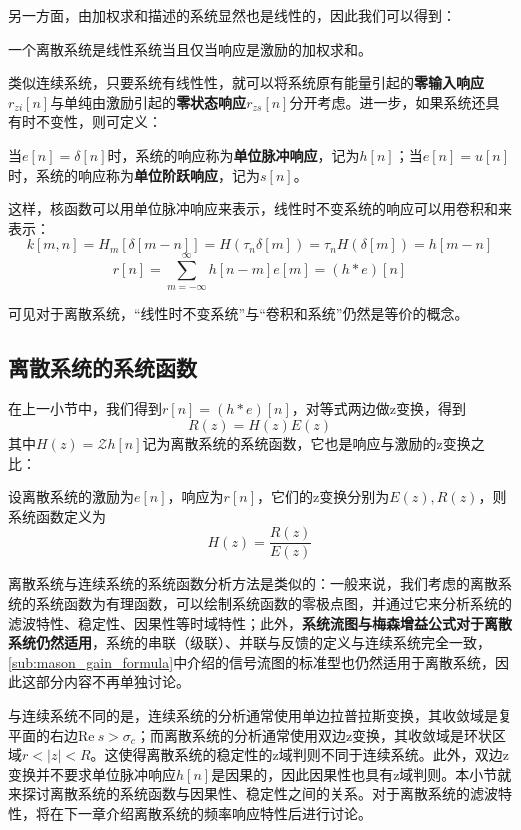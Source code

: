 \documentclass{ctexbook}
\begin{document}
另一方面，由加权求和描述的系统显然也是线性的，因此我们可以得到：
\begin{proposition}[离散线性系统的等价定义]
    一个离散系统是线性系统当且仅当响应是激励的加权求和。
\end{proposition}

类似连续系统，只要系统有线性性，就可以将系统原有能量引起的\textbf{零输入响应}$r_{zi}[n]$与单纯由激励引起的\textbf{零状态响应}$r_{zs}[n]$分开考虑。进一步，如果系统还具有时不变性，则可定义：
\begin{definition}[单位脉冲响应与单位阶跃响应]
    当$e[n]=\delta[n]$时，系统的响应称为\textbf{单位脉冲响应}，记为$h[n]$；当$e[n]=u[n]$时，系统的响应称为\textbf{单位阶跃响应}，记为$s[n]$。
\end{definition}

这样，核函数可以用单位脉冲响应来表示，线性时不变系统的响应可以用卷积和来表示：
\[k[m,n]=H_m[\delta[m-n]]=H(\tau_n \delta[m])=\tau_n H(\delta[m])=h[m-n]\]
\[r[n]=\sum_{m=-\infty}^{\infty}h[n-m]e[m]=(h*e)[n]\]

可见对于离散系统，“线性时不变系统”与“卷积和系统”仍然是等价的概念。

\subsection{离散系统的系统函数}\label{sub:discrete_system_function}

在上一小节中，我们得到$r[n]=(h*e)[n]$，对等式两边做z变换，得到
\[R(z)=H(z)E(z)\]
其中$H(z)=\mathcal{Z} h[n]$记为离散系统的系统函数，它也是响应与激励的z变换之比：
\begin{definition}[离散系统的系统函数]
    设离散系统的激励为$e[n]$，响应为$r[n]$，它们的z变换分别为$E(z),R(z)$，则系统函数定义为
    \[H(z)=\frac{R(z)}{E(z)}\]
\end{definition}

离散系统与连续系统的系统函数分析方法是类似的：一般来说，我们考虑的离散系统的系统函数为有理函数，可以绘制系统函数的零极点图，并通过它来分析系统的滤波特性、稳定性、因果性等时域特性；此外，\textbf{系统流图与梅森增益公式对于离散系统仍然适用}，系统的串联（级联）、并联与反馈的定义与连续系统完全一致，\ref{sub:mason_gain_formula}中介绍的信号流图的标准型也仍然适用于离散系统，因此这部分内容不再单独讨论。

与连续系统不同的是，连续系统的分析通常使用单边拉普拉斯变换，其收敛域是复平面的右边$\text{Re}\ s>\sigma_c$；而离散系统的分析通常使用双边z变换，其收敛域是环状区域$r<|z|<R$。这使得离散系统的稳定性的z域判则不同于连续系统。此外，双边z变换并不要求单位脉冲响应$h[n]$是因果的，因此因果性也具有z域判则。本小节就来探讨离散系统的系统函数与因果性、稳定性之间的关系。对于离散系统的滤波特性，将在下一章介绍离散系统的频率响应特性后进行讨论。
\end{document}
